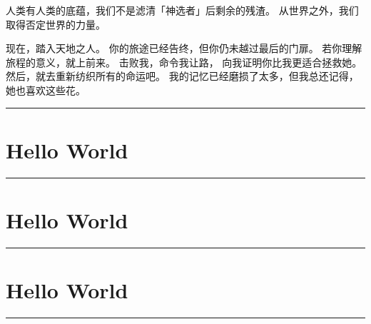 \documentclass[a4paper,11pt]{article}
\begin{document}
\begin{tcolorbox}[arc=0pt,colback=white,colframe=white,boxsep=0pt,boxrule=0pt,width=\textwidth,height=\textheight-9em-1.5em,top=0pt,bottom=1pt,left=0pt,right=0pt]
\begin{minipage}[b][\textheight-9.5em][t]{31em}
\begin{multicols}{2}
			人类有人类的底蕴，我们不是滤清「神选者」后剩余的残渣。
			从世界之外，我们取得否定世界的力量。\par
			现在，踏入天地之人。
			你的旅途已经告终，但你仍未越过最后的门扉。
			若你理解旅程的意义，就上前来。
			击败我，命令我让路，
			向我证明你比我更适合拯救她。
			然后，就去重新纺织所有的命运吧。
			我的记忆已经磨损了太多，但我总还记得，她也喜欢这些花。\par
			\vspace{1em}\hspace{1pt}
		\end{multicols}\par
		\vskip 1pt
	\end{minipage}\hfill\rule{1pt}{\textheight-9.5em}\hfill
	\begin{minipage}[b][\textheight-9.5em][t]{13em}
		\section*{Hello World}
		\lipsum[1-2][1-6]\par
		\vskip 5pt\vfill\hrule\vskip 5pt\vfill
		\section*{Hello World}
		\lipsum[1-2][1-6]\par
		\vskip 5pt\vfill\hrule\vskip 5pt\vfill
		\section*{Hello World}
		\lipsum[1-2][1-6]\par
		\vskip 5pt\vfill
	\end{minipage}\par
\end{tcolorbox}\par\vfill
\rule{\linewidth}{1pt}
\clearpage
\end{document}
